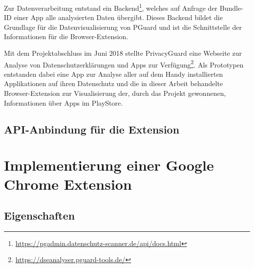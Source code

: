 Zur Datenverarbeitung entstand ein Backend\footnote{\url{https://pgadmin.datenschutz-scanner.de/api/docs.html}}, welches auf Anfrage der Bundle-ID einer App alle analysierten Daten übergibt. Dieses Backend bildet die Grundlage für die Datenvisualisierung von PGuard und ist die Schnittstelle der Informationen für die Browser-Extension.

Mit dem Projektabschluss im Juni 2018 stellte PrivacyGuard eine Webseite zur Analyse von Datenschutzerklärungen und Apps zur Verfügung\footnote{\url{https://dseanalyser.pguard-tools.de/}}. Als Prototypen entstanden dabei eine App zur Analyse aller auf dem Handy installierten Applikationen auf ihren Datenschutz und die in dieser Arbeit behandelte Browser-Extension zur Visualisierung der, durch das Projekt gewonnenen, Informationen über Apps im PlayStore.

\subsection{API-Anbindung für die Extension}
\label{ss:apianbindung}


\section{Implementierung einer Google Chrome Extension}
\label{s:implementierung}

\subsection{Eigenschaften}
\label{ss:eigenschaften}


